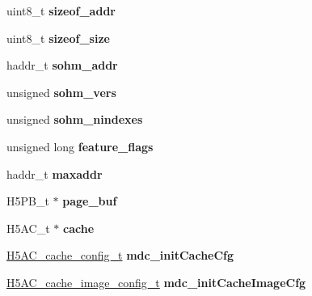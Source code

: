 \begin{DoxyCompactItemize}
uint8\+\_\+t {\bfseries sizeof\+\_\+addr}
\item 
\mbox{\label{struct_h5_f__file__t_a5fb7918ae7b627bcb4cfd282780501cb}} 
uint8\+\_\+t {\bfseries sizeof\+\_\+size}
\item 
\mbox{\label{struct_h5_f__file__t_adb8d25400042c26101b26f4bcbb13a95}} 
haddr\+\_\+t {\bfseries sohm\+\_\+addr}
\item 
\mbox{\label{struct_h5_f__file__t_a356ee18e453ef038e4b8873036d164e3}} 
unsigned {\bfseries sohm\+\_\+vers}
\item 
\mbox{\label{struct_h5_f__file__t_a051dd3ee4fb04410636f181a43feca13}} 
unsigned {\bfseries sohm\+\_\+nindexes}
\item 
\mbox{\label{struct_h5_f__file__t_af9808ed3e13c0a5562f810f77d853324}} 
unsigned long {\bfseries feature\+\_\+flags}
\item 
\mbox{\label{struct_h5_f__file__t_af3a21ea452b6b2ae0ba13517c594ca60}} 
haddr\+\_\+t {\bfseries maxaddr}
\item 
\mbox{\label{struct_h5_f__file__t_ac604dd711ecfa6885e8de71ba913d771}} 
H5\+P\+B\+\_\+t $\ast$ {\bfseries page\+\_\+buf}
\item 
\mbox{\label{struct_h5_f__file__t_a09a50abf030bd775e04a5723204203c9}} 
H5\+A\+C\+\_\+t $\ast$ {\bfseries cache}
\item 
\mbox{\label{struct_h5_f__file__t_ab5c59e67296c088784394fac51753be2}} 
\hyperlink{struct_h5_a_c__cache__config__t}{H5\+A\+C\+\_\+cache\+\_\+config\+\_\+t} {\bfseries mdc\+\_\+init\+Cache\+Cfg}
\item 
\mbox{\label{struct_h5_f__file__t_adafd6df6bb954c9398dbd979f0425db6}} 
\hyperlink{struct_h5_a_c__cache__image__config__t}{H5\+A\+C\+\_\+cache\+\_\+image\+\_\+config\+\_\+t} {\bfseries mdc\+\_\+init\+Cache\+Image\+Cfg}
\item 
\mbox{\label{struct_h5_f__file__t_adc18af9e2ae4df24ac1e547615285b98}} 

\end{DoxyCompactItemize}
